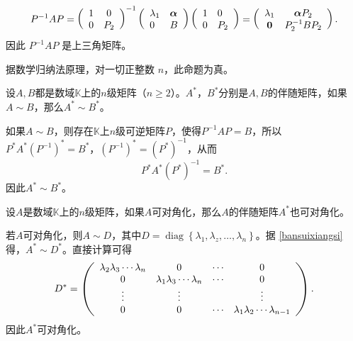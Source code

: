 \begin{enumerate}[1~]
\begin{enumerate}[1.~]
\begin{remark}
\begin{subproof}
\[P ^ { - 1 } A P = \left( \begin{array} { c c } { 1 } & { 0 } \\ { 0 } & { P _ { 2 } } \end{array} \right) ^ { - 1 } \left( \begin{array} { l l } { \lambda _ { 1 } } & { \boldsymbol{\alpha} } \\ { 0 } & { B } \end{array} \right) \left( \begin{array} { l l } { 1 } & { 0 } \\ { 0 } & { P _ { 2 } } \end{array} \right)  = \left( \begin{array} { c c } { \lambda _ { 1 } } & { \boldsymbol { \boldsymbol{\alpha} } P _ { 2 } } \\ { \mathbf { 0 } } & { P _ { 2 } ^ { - 1 } B P _ { 2 } } \end{array} \right). \]
因此 $P^{-1}AP$ 是上三角矩阵。

据数学归纳法原理，对一切正整数 $n$，此命题为真。
\end{subproof}

\begin{lemma}\label{bansuixiangsi}
设$A, B$都是数域$\mathbb{K}$上的$n$级矩阵（$n \ge 2$）。$A^*$，$B^*$分别是$A, B$的伴随矩阵，如果$ A \sim B$，那么$ A^* \sim B^*$。
\end{lemma}

\begin{subproof}
如果$ A \sim B$，则存在$\mathbb{K}$上$n$级可逆矩阵$P$，使得$P^{-1}AP= B$，所以$P^*A^*\left(P^{-1}\right)^*= B^*$，$\left( P ^ { - 1 } \right) ^ { * } = \left( P ^ { * } \right) ^ { - 1 }$，从而\[
P ^ { * } A ^ { * } \left( P ^ { * } \right) ^ { - 1 } = B ^ { * }. \]
因此$A ^ { * } \sim B ^ { * }$。
\end{subproof}

\begin{lemma}\label{bansuiduijiaohua}
设$A$是数域$\mathbb{K}$上的$n$级矩阵，如果$A$可对角化，那么$A$的伴随矩阵$A^*$也可对角化。
\end{lemma}

\begin{subproof}
若$A$可对角化，则$A \sim D$，其中$D = \operatorname { diag } \left\{ \lambda _ { 1 } , \lambda _ { z } , \dots , \lambda _ { n } \right\}$。据 \eqref{bansuixiangsi} 得，$A ^ { * } \sim D ^ { * }$。直接计算可得\[
D ^ { * } = \left( \begin{array} { c c c c } { \lambda _ { 2 } \lambda _ { 3 } \cdots \lambda _ { n } } & { 0 } & { \cdots } & { 0 } \\ { 0 } & { \lambda _ { 1 } \lambda _ { 3 } \cdots \lambda _ { n } } & { \cdots } & { 0 } \\ { \vdots } & { \vdots } & { } & { \vdots } \\ { 0 } & { 0 } & { \cdots } & { \lambda _ { 1 } \lambda _ { 2 } \cdots \lambda _ { n - 1 } } \end{array} \right). \]
因此$A^*$可对角化。
\end{subproof}


\end{remark}
\end{enumerate}
\end{enumerate}
